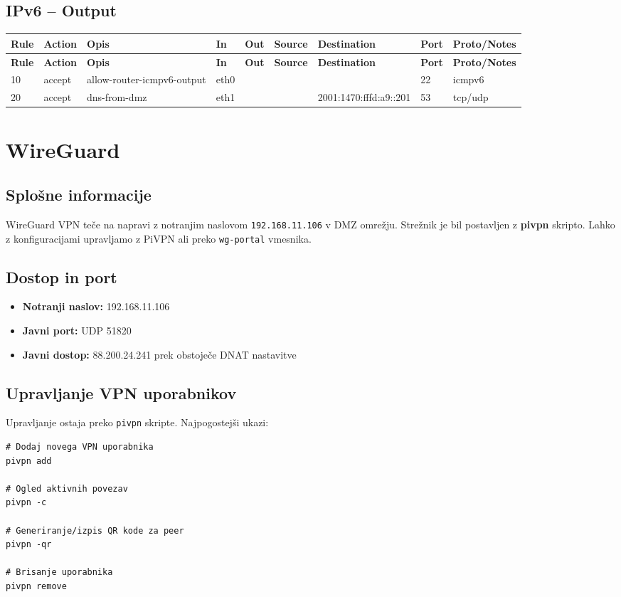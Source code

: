 \documentclass[a4paper,11pt]{article}
\begin{document}
\begin{landscape}
\subsection{IPv6 -- Output}
\begin{longtable}{|l|l|l|l|l|l|l|p{2.2cm}|l|}
\hline
\textbf{Rule} & \textbf{Action} & \textbf{Opis} & \textbf{In} & \textbf{Out} & \textbf{Source} & \textbf{Destination} & \textbf{Port} & \textbf{Proto/Notes} \\
\hline
\endfirsthead
\hline
\textbf{Rule} & \textbf{Action} & \textbf{Opis} & \textbf{In} & \textbf{Out} & \textbf{Source} & \textbf{Destination} & \textbf{Port} & \textbf{Proto/Notes} \\
\hline
\endhead
10 & accept & allow-router-icmpv6-output & eth0 &  &  &  & 22 & icmpv6 \\
20 & accept & dns-from-dmz & eth1 &  &  & 2001:1470:fffd:a9::201 & 53 & tcp/udp \\
\hline
\end{longtable}

\end{landscape}

\section{WireGuard}

\subsection{Splošne informacije}
WireGuard VPN teče na napravi z notranjim naslovom \texttt{192.168.11.106} v DMZ omrežju. Strežnik je bil postavljen z \textbf{pivpn} skripto.
Lahko z konfiguracijami upravljamo z PiVPN ali preko \texttt{wg-portal} vmesnika.

\subsection{Dostop in port}
\begin{itemize}
  \item \textbf{Notranji naslov:} 192.168.11.106
  \item \textbf{Javni port:} UDP 51820
  \item \textbf{Javni dostop:} 88.200.24.241 prek obstoječe DNAT nastavitve
\end{itemize}

\subsection{Upravljanje VPN uporabnikov}
Upravljanje ostaja preko \texttt{pivpn} skripte. Najpogostejši ukazi:
\begin{lstlisting}
# Dodaj novega VPN uporabnika
pivpn add

# Ogled aktivnih povezav
pivpn -c

# Generiranje/izpis QR kode za peer
pivpn -qr

# Brisanje uporabnika
pivpn remove
\end{lstlisting}
\end{document}
